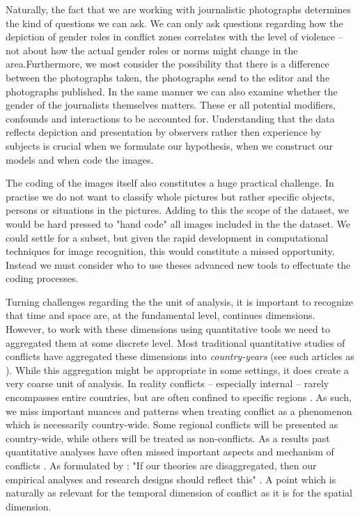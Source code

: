 \documentclass[a4paper]{article}
\begin{document}
Naturally, the fact that we are working with journalistic photographs determines the kind of questions we can ask. We can only ask questions regarding how the depiction of gender roles in conflict zones correlates with the level of violence -- not about how the actual gender roles or norms might change in the area.Furthermore, we most consider the possibility that there is a difference between the photographs taken, the photographs send to the editor and the photographs published. In the same manner we can also examine whether the gender of the journalists themselves matters. These er all potential modifiers, confounds and interactions to be accounted for. Understanding that the data reflects depiction and presentation by observers rather then experience by subjects is crucial when we formulate our hypothesis, when we construct our models and when code the images.\par

The coding of the images itself also constitutes a huge practical challenge. In practise we do not want to classify whole pictures but rather specific objects, persons or situations in the pictures. Adding to this the scope of the dataset, we would be hard pressed to "hand code" all images included in the the dataset. We could settle for a subset, but given the rapid development in computational techniques for image recognition, this would constitute a missed opportunity. Instead we must consider who to use theses advanced new tools to effectuate the coding processes.\par 

Turning challenges regarding the the unit of analysis, it is important to recognize that time and space are, at the fundamental level, continues dimensions. However, to work with these dimensions using quantitative tools we need to aggregated them at some discrete level. Most traditional quantitative studies of conflicts have aggregated these dimensions into \emph{country-years} (see such articles as \cite{Collier_Hoeffler_1998, Fearon_Laitin_2003, Collier_Hoeffler_2004, Fearon_2004, Ross_2004, Fearon_2005, Hegre_Sambanis_2006, Goldstone_2010}). While this aggregation might be appropriate in some settings, it does create a very coarse unit of analysis. In reality conflicts -- especially internal -- rarely encompasses entire countries, but are often confined to specific regions \cite[487]{Cederman_Gleditsch_2009}. As such, we miss important nuances and patterns when treating conflict as a phenomenon which is necessarily country-wide. Some regional conflicts will be presented as country-wide, while others will be treated as non-conflicts. As a results past quantitative analyses have often missed important aspects and mechanism of conflicts \cite{Cederman_Gleditsch_2009, Cederman_Gleditsch_Buhaug_2013}. As formulated by \cite{Cederman_Gleditsch_2009}: "If our theories are disaggregated, then our empirical analyses and research designs should reflect this" \citep[490]{Cederman_Gleditsch_2009}. A point which is naturally as relevant for the temporal dimension of conflict as it is for the spatial dimension.\par 
\end{document}
